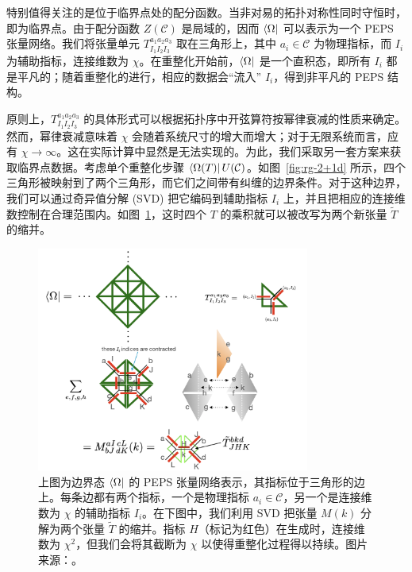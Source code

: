 特别值得关注的是位于临界点处的配分函数。当非对易的拓扑对称性同时守恒时，即为临界点。由于配分函数 $Z(\mathcal{C})$ 是局域的，因而 $\bra{\Omega}$ 可以表示为一个 PEPS 张量网络。我们将张量单元 $T^{a_1 a_2 a_3}_{I_1 I_2 I_3}$ 取在三角形上，其中 $a_i\in\mathcal{C}$ 为物理指标，而 $I_i$ 为辅助指标，连接维数为 $\chi$。在重整化开始前，$\bra{\Omega}$ 是一个直积态，即所有 $I_i$ 都是平凡的；随着重整化的进行，相应的数据会“流入” $I_i$，得到非平凡的 PEPS 结构。

原则上，$T^{a_1 a_2 a_3}_{I_1 I_2 I_3}$ 的具体形式可以根据拓扑序中开弦算符按幂律衰减的性质来确定。然而，幂律衰减意味着 $\chi$ 会随着系统尺寸的增大而增大；对于无限系统而言，应有 $\chi\to\infty$。这在实际计算中显然是无法实现的。为此，我们采取另一套方案来获取临界点数据。考虑单个重整化步骤 $\bra{\Omega(T)}U(\mathcal{C})$。如图~\ref{fig:rg-2+1d} 所示，四个三角形被映射到了两个三角形，而它们之间带有纠缠的边界条件。对于这种边界，我们可以通过奇异值分解 (SVD) 把它编码到辅助指标 $I_i$ 上，并且把相应的连接维数控制在合理范围内。如图~\ref{fig:rg-2+1d-blocking}，这时四个 $T$ 的乘积就可以被改写为两个新张量 $\tilde{T}$ 的缩并。

\begin{figure}[htb]
  \centering
  \includegraphics[width=0.8\textwidth]{images/holographic/rg-2+1d-blocking.png}
  \caption[边界态 $\bra{\Omega}$ 的 PEPS 张量网络表示]{上图为边界态 $\bra{\Omega}$ 的 PEPS 张量网络表示，其指标位于三角形的边上。每条边都有两个指标，一个是物理指标 $a_i\in\mathcal{C}$，另一个是连接维数为 $\chi$ 的辅助指标 $I_i$。在下图中，我们利用 SVD 把张量 $M(k)$ 分解为两个张量 $\tilde{T}$ 的缩并。指标 $H$（标记为红色）在生成时，连接维数为 $\chi^2$，但我们会将其截断为 $\chi$ 以使得重整化过程得以持续。图片来源：\parencite{chen2022exact}。}
  \label{fig:rg-2+1d-blocking}
\end{figure}

